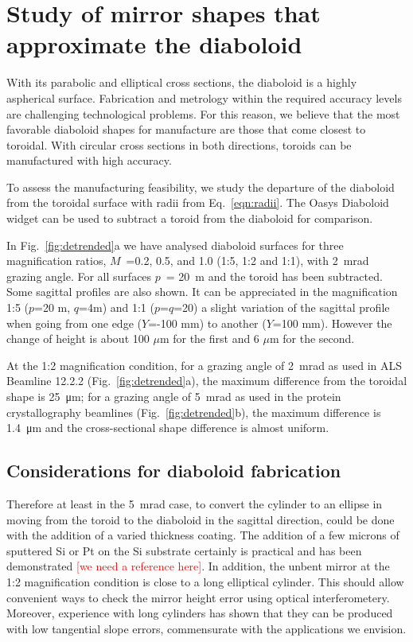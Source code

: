 \documentclass{iucr}       %
\begin{document}
\section{Study of mirror shapes that approximate the diaboloid}
\label{sec:approximatedShapes}

With its parabolic and elliptical cross sections, the diaboloid is a highly aspherical surface. Fabrication and metrology within the required accuracy levels are challenging technological problems. For this reason, we believe that the most favorable diaboloid shapes for manufacture are those that come closest to toroidal. With circular cross sections in both directions, toroids can be manufactured with high accuracy.

To assess the manufacturing feasibility, we study the departure of the diaboloid from the toroidal surface with radii from Eq.~\ref{eqn:radii}. The Oasys Diaboloid widget can be used to subtract a toroid from the diaboloid for comparison.

In Fig.~\ref{fig:detrended}a we have analysed diaboloid surfaces for three magnification ratios, $M$~=0.2, 0.5, and 1.0 (1:5, 1:2 and 1:1), with \SI{2}{\milli\radian} grazing angle. For all surfaces $p$~= \SI{20}{\meter} and the toroid has been subtracted. Some sagittal profiles are also shown. It can be appreciated in the magnification 1:5 ($p$=20 m, $q$=4m) and 1:1 ($p$=$q$=20) a slight variation of the sagittal profile when going from one edge ($Y$=-100 mm) to another ($Y$=100 mm). However the change of height is about 100 $\mu$m for the first and 6 $\mu$m for the second. 

At the 1:2 magnification condition, for a grazing angle of \SI{2}{\milli\radian} as used in ALS Beamline 12.2.2 (Fig.~\ref{fig:detrended}a), the maximum difference from the toroidal shape is \SI{25}{\micro\meter}; for a grazing angle of  \SI{5}{\milli\radian} as used in the protein crystallography beamlines (Fig.~\ref{fig:detrended}b), the maximum difference is \SI{1.4}{\micro\meter} and the cross-sectional shape difference is almost uniform.

\subsection{Considerations for diaboloid fabrication}
Therefore at least in the \SI{5}{\milli\radian} case, to convert the cylinder to an ellipse in moving from the toroid to the diaboloid in the sagittal direction, could be done with the addition of a varied thickness coating. The addition of a few microns of sputtered Si or Pt on the Si substrate certainly is practical and has been demonstrated \textcolor{red}{[we need a reference here]}. In addition, the unbent mirror at the 1:2 magnification condition is close to a long elliptical cylinder. This should allow convenient ways to check the mirror height error using optical interferometery. Moreover, experience with long cylinders has shown that they can be produced with low tangential slope errors, commensurate with the applications we envision. 
\end{document}
